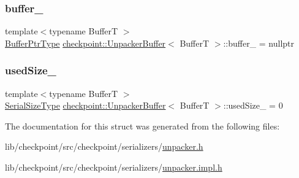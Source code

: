 \subsubsection{\texorpdfstring{buffer\+\_\+}{buffer\_}}
{\footnotesize\ttfamily template$<$typename BufferT $>$ \\
\hyperlink{structcheckpoint_1_1_unpacker_buffer_acdd2460fdb60fc584e04cb4069060613}{Buffer\+Ptr\+Type} \hyperlink{structcheckpoint_1_1_unpacker_buffer}{checkpoint\+::\+Unpacker\+Buffer}$<$ BufferT $>$\+::buffer\+\_\+ = nullptr\hspace{0.3cm}{\ttfamily [private]}}

\mbox{\label{structcheckpoint_1_1_unpacker_buffer_ad8bc7d5cd0a7f6b22169c982abf08965}} 
\subsubsection{\texorpdfstring{used\+Size\+\_\+}{usedSize\_}}
{\footnotesize\ttfamily template$<$typename BufferT $>$ \\
\hyperlink{namespacecheckpoint_a083f6674da3f94c2901b18c6d238217c}{Serial\+Size\+Type} \hyperlink{structcheckpoint_1_1_unpacker_buffer}{checkpoint\+::\+Unpacker\+Buffer}$<$ BufferT $>$\+::used\+Size\+\_\+ = 0\hspace{0.3cm}{\ttfamily [private]}}



The documentation for this struct was generated from the following files\+:\begin{DoxyCompactItemize}
\item 
lib/checkpoint/src/checkpoint/serializers/\hyperlink{unpacker_8h}{unpacker.\+h}\item 
lib/checkpoint/src/checkpoint/serializers/\hyperlink{unpacker_8impl_8h}{unpacker.\+impl.\+h}\end{DoxyCompactItemize}
